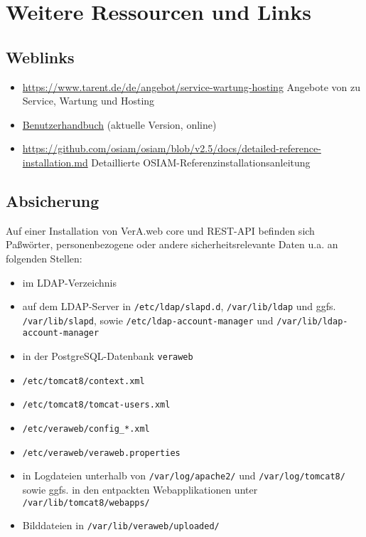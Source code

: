 \documentclass{tarentanleitung}
\begin{document}
\section{Weitere Ressourcen und Links}\label{sec:links}

\subsection{Weblinks}\label{subsec:links-web}

\begin{itemize}
 \item{\href{https://www.tarent.de/de/angebot/service-wartung-hosting}{https://www.tarent.de/de/angebot/service-wartung-hosting}
  \dash Angebote von  zu\\
  Service, Wartung und Hosting}
 \item{\href{https://evolvis.org/plugins/scmgit/cgi-bin/gitweb.cgi?p=veraweb/veraweb.git;a=blob_plain;f=vwor/src/main/webapp/doc/Benutzerhandbuch.pdf;hb=HEAD}{Benutzerhandbuch}
  (aktuelle Version, online)}
 \item{\href{https://github.com/osiam/osiam/blob/v2.5/docs/detailed-reference-installation.md}{https://github.com/osiam/osiam/blob/v2.5/docs/detailed-reference-installation.md}
  \dash Detaillierte OSIAM-Referenzinstallationsanleitung}
\end{itemize}

\subsection{Absicherung}\label{subsec:links-sec}

Auf einer Installation von VerA.web core und REST-API befinden sich
Paßwörter, personenbezogene oder andere sicherheitsrelevante Daten
u.a. an folgenden Stellen:\keinumbruch

\begin{itemize}
 \item{im LDAP-Verzeichnis}
 \item{auf dem LDAP-Server in \texttt{/etc/ldap/slapd.d},
  \texttt{/var/lib/ldap} und ggfs. \texttt{/var/lib/slapd},
  sowie \texttt{/etc/ldap-account-manager} und
  \texttt{/var/lib/ldap-account-manager}}
 \item{in der PostgreSQL-Datenbank \texttt{veraweb}}
 \item{\texttt{/etc/tomcat8/context.xml}}
 \item{\texttt{/etc/tomcat8/tomcat-users.xml}}
 \item{\texttt{/etc/veraweb/config\_*.xml}}
 \item{\texttt{/etc/veraweb/veraweb.properties}}
 \item{in Logdateien unterhalb von \texttt{/var/log/apache2/}
  und \texttt{/var/log/tomcat8/} sowie ggfs. in den entpackten
  Webapplikationen unter \texttt{/var/lib/tomcat8/webapps/}}
 \item{Bilddateien in \texttt{/var/lib/veraweb/uploaded/}}
\end{itemize}
\end{document}

